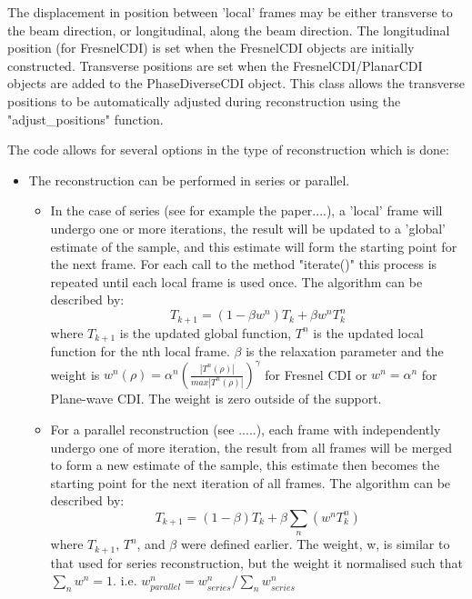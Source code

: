 \documentclass[]{cxs-software}
\begin{document}
The displacement in position between 'local' frames may be either
transverse to the beam direction, or longitudinal, along the beam
direction. The longitudinal position (for FresnelCDI) is set when the
FresnelCDI objects are initially constructed. Transverse positions are
set when the FresnelCDI/PlanarCDI objects are added to the
PhaseDiverseCDI object. This class allows the transverse positions to
be automatically adjusted during reconstruction using the
"adjust\_positions" function.

The code allows for several options in the type of reconstruction
which is done:

\begin{itemize}

\item The reconstruction can be performed in series or parallel.
  \begin{itemize}

    \item In the case of series (see for example the paper....), a
      'local' frame will undergo one or more iterations, the result
      will be updated to a 'global' estimate of the sample, and this
      estimate will form the starting point for the next frame. For
      each call to the method "iterate()" this process is repeated
      until each local frame is used once. The algorithm can be
      described by:
      \[ T_{k+1} = (1-\beta w^n)T_k + \beta w^n T^n_k \] 
      where $T_{k+1}$ is the updated global function, $T^n$ is the
      updated local function for the nth local frame. $\beta$ is the
      relaxation parameter and the weight is $ w^n(\rho) = \alpha^n
      (\frac{|T^n(\rho)|}{max|T^n(\rho)|} )^\gamma $ for Fresnel CDI
      or $w^n = \alpha^n$ for Plane-wave CDI. The weight is zero
      outside of the support.

   \item For a parallel reconstruction (see .....), each frame with
     independently undergo one of more iteration, the result from all
     frames will be merged to form a new estimate of the sample, this
     estimate then becomes the starting point for the next iteration
     of all frames. The algorithm can be described by:
     \[T_{k+1} = (1-\beta)T_k + \beta \sum_n(w^n T^n_k)\]
     where $T_{k+1}$, $T^n$, and $\beta$ were defined
    earlier. The weight, w, is similar to that used for series
    reconstruction, but the weight it normalised such that 
    $ \sum_n w^n = 1 $.  i.e. $ w^n_{parallel}= w^n_{series} / \sum_n w^n_{series} $


\end{itemize}
\end{itemize}
\end{document}
